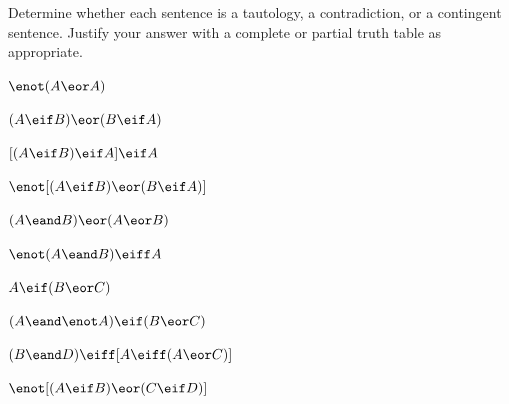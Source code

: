 \noindent\problempart
\label{pr.TT.TTorC4}
Determine whether each sentence is a tautology, a contradiction, or a contingent sentence. Justify your answer with a complete or partial truth table as appropriate.
\begin{compactlist}
\item  $\enot (A \eor A)$\vspace{.5ex}		\hfill			{}	%
\item $(A \eif B) \eor (B \eif A)$\vspace{.5ex}	\hfill		{}	%
\item $[(A \eif B) \eif A] \eif A$\vspace{.5ex}	\hfill			{}   %
\item $\enot[( A \eif B) \eor (B \eif A)]$\vspace{.5ex}	\hfill		{}	%
\item $(A \eand B) \eor (A \eor B)$\vspace{.5ex} 	\hfill			{}	%
\item $\enot(A\eand B) \eiff A$\vspace{.5ex} 		\hfill			{}	%
\item $A\eif(B\eor C)$\vspace{.5ex} 				\hfill			{}	%
\item $(A \eand\enot A) \eif (B \eor C)$\vspace{.5ex} 	\hfill		{}	%
\item $(B\eand D) \eiff [A \eiff(A \eor C)]$\vspace{.5ex}\hfill		{}	%
\item $\enot[(A \eif B) \eor (C \eif D)]$\vspace{.5ex} 	\hfill		{}	%
\end{compactlist}



